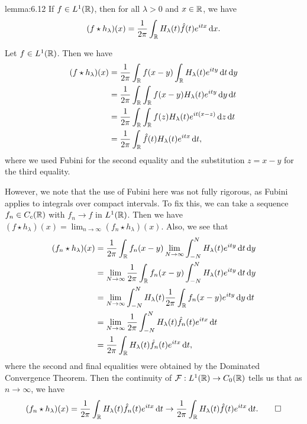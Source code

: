 \begin{lemma}{lemma:6.12}
    If $f \in L^1(\mathbb{R})$, then for all $\lambda > 0$ and $x \in \mathbb{R}$, we have 
    \[ (f \star h_\lambda)(x) = \frac{1}{2\pi} \int_{\mathbb{R}} H_\lambda(t) 
    \hat f(t) e^{itx}\,\mathrm{d} x. \] 
\end{lemma}
\begin{pf}
    Let $f \in L^1(\mathbb{R})$. Then we have 
    \begin{align*}
        (f \star h_\lambda)(x) 
        &= \frac{1}{2\pi} \int_{\mathbb{R}} f(x-y) \int_{\mathbb{R}} H_\lambda(t) e^{ity} \,\mathrm{d} t \,\mathrm{d} y \\ 
        &= \frac{1}{2\pi} \int_{\mathbb{R}} \int_{\mathbb{R}} f(x-y) H_\lambda(t) e^{ity} \,\mathrm{d} y \,\mathrm{d} t \\ 
        &= \frac{1}{2\pi} \int_{\mathbb{R}} \int_{\mathbb{R}} f(z) H_\lambda(t) e^{it(x-z)} \,\mathrm{d} z \,\mathrm{d} t \\ 
        &= \frac{1}{2\pi} \int_{\mathbb{R}} \hat f(t) H_\lambda(t) e^{itx} \,\mathrm{d} t, 
    \end{align*}
    where we used Fubini for the second equality and the substitution 
    $z = x - y$ for the third equality. 
    
    \newpage 
    However, we note that the use of Fubini here was not fully rigorous, 
    as Fubini applies to integrals over compact intervals. To fix this, 
    we can take a sequence $f_n \in C_c(\mathbb{R})$ with $f_n \to f$ in $L^1(\mathbb{R})$. 
    Then we have $(f \star h_\lambda)(x) = \lim_{n\to\infty} (f_n \star 
    h_\lambda)(x)$. Also, we see that 
    \begin{align*}
        (f_n \star h_\lambda)(x) 
        &= \frac{1}{2\pi} \int_{\mathbb{R}} f_n(x-y) \lim_{N\to\infty} \int_{-N}^N H_\lambda(t) e^{ity} \,\mathrm{d} t \,\mathrm{d} y \\ 
        &= \lim_{N\to\infty} \frac{1}{2\pi} \int_{\mathbb{R}} f_n(x-y) \int_{-N}^N H_\lambda(t) e^{ity} \,\mathrm{d} t \,\mathrm{d} y \\
        &= \lim_{N\to\infty} \int_{-N}^N H_\lambda(t) \frac{1}{2\pi} \int_{\mathbb{R}} f_n(x-y) e^{ity} \,\mathrm{d} y \,\mathrm{d} t \\ 
        &= \lim_{N\to\infty} \frac{1}{2\pi} \int_{-N}^N H_\lambda(t) \hat f_n(t) e^{itx} \,\mathrm{d} t \\ 
        &= \frac{1}{2\pi} \int_{\mathbb{R}} H_\lambda(t) \hat f_n(t) e^{itx} \,\mathrm{d} t,
    \end{align*}
    where the second and final equalities were obtained by the Dominated Convergence 
    Theorem. Then the continuity of ${\cal F} : L^1(\mathbb{R}) \to C_0(\mathbb{R})$ tells us that 
    as $n \to \infty$, we have 
    \[ (f_n \star h_\lambda)(x) 
    = \frac{1}{2\pi} \int_{\mathbb{R}} H_\lambda(t) \hat f_n(t) e^{itx} \,\mathrm{d} t
    \to \frac{1}{2\pi} \int_{\mathbb{R}} H_\lambda(t) \hat f(t) e^{itx} \,\mathrm{d} t. \qedhere \] 
\end{pf}

